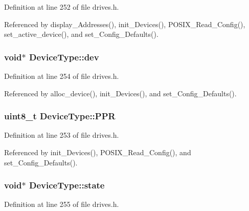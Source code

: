 Definition at line 252 of file drives.\+h.



Referenced by display\+\_\+\+Addresses(), init\+\_\+\+Devices(), P\+O\+S\+I\+X\+\_\+\+Read\+\_\+\+Config(), set\+\_\+active\+\_\+device(), and set\+\_\+\+Config\+\_\+\+Defaults().

\subsubsection[{\texorpdfstring{dev}{dev}}]{\setlength{\rightskip}{0pt plus 5cm}void$\ast$ Device\+Type\+::dev}\hypertarget{structDeviceType_a59fc3b3cb45f8ee0cd1016bd64804d3b}{}\label{structDeviceType_a59fc3b3cb45f8ee0cd1016bd64804d3b}


Definition at line 254 of file drives.\+h.



Referenced by alloc\+\_\+device(), init\+\_\+\+Devices(), and set\+\_\+\+Config\+\_\+\+Defaults().

\subsubsection[{\texorpdfstring{P\+PR}{PPR}}]{\setlength{\rightskip}{0pt plus 5cm}uint8\+\_\+t Device\+Type\+::\+P\+PR}\hypertarget{structDeviceType_ae0e59c6c17582ff80bdab3f2010e8d57}{}\label{structDeviceType_ae0e59c6c17582ff80bdab3f2010e8d57}


Definition at line 253 of file drives.\+h.



Referenced by init\+\_\+\+Devices(), P\+O\+S\+I\+X\+\_\+\+Read\+\_\+\+Config(), and set\+\_\+\+Config\+\_\+\+Defaults().

\subsubsection[{\texorpdfstring{state}{state}}]{\setlength{\rightskip}{0pt plus 5cm}void$\ast$ Device\+Type\+::state}\hypertarget{structDeviceType_ad0fc43d63606bab6c259047e36512e08}{}\label{structDeviceType_ad0fc43d63606bab6c259047e36512e08}


Definition at line 255 of file drives.\+h.



